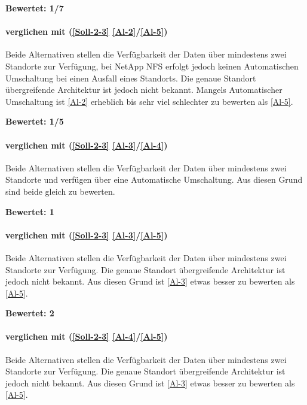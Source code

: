 \textbf{Bewertet: 1/7}

\paragraph*{  verglichen mit  (\ref{Soll-2-3} \ref{Al-2}/\ref{Al-5})}
Beide Alternativen stellen die Verfügbarkeit der Daten über mindestens zwei Standorte zur Verfügung, bei NetApp NFS erfolgt jedoch keinen Automatischen Umschaltung bei einen Ausfall eines Standorts. Die genaue Standort übergreifende Architektur ist jedoch nicht bekannt. Mangels Automatischer Umschaltung ist  \ref{Al-2} erheblich bis sehr viel schlechter  zu bewerten als  \ref{Al-5}.

\textbf{Bewertet: 1/5}

\paragraph*{  verglichen mit  (\ref{Soll-2-3} \ref{Al-3}/\ref{Al-4})}
Beide Alternativen stellen die Verfügbarkeit der Daten über mindestens zwei Standorte und verfügen über eine Automatische Umschaltung. Aus diesen Grund sind beide gleich zu bewerten. 

\textbf{Bewertet: 1}

\paragraph*{  verglichen mit  (\ref{Soll-2-3} \ref{Al-3}/\ref{Al-5})}
Beide Alternativen stellen die Verfügbarkeit der Daten über mindestens zwei Standorte zur Verfügung. Die genaue Standort übergreifende Architektur ist jedoch nicht bekannt. Aus diesen Grund ist  \ref{Al-3} etwas besser zu bewerten als  \ref{Al-5}.

\textbf{Bewertet: 2}

\paragraph*{  verglichen mit  (\ref{Soll-2-3} \ref{Al-4}/\ref{Al-5})}
Beide Alternativen stellen die Verfügbarkeit der Daten über mindestens zwei Standorte zur Verfügung. Die genaue Standort übergreifende Architektur ist jedoch nicht bekannt.  Aus diesen Grund ist  \ref{Al-3} etwas besser zu bewerten als  \ref{Al-5}.

